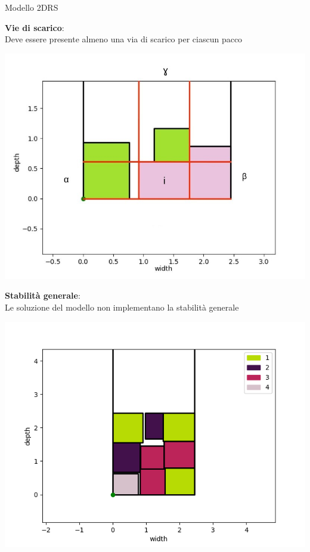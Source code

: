 \documentclass{beamer}
\begin{document}
\begin{frame}{Modello 2DRS}
					
	\begin{minipage}[c]{0.45\textwidth}
		\textbf{Vie di scarico}:\\Deve essere presente almeno una via di scarico per ciascun pacco
	\end{minipage}
	\hfill
	\begin{minipage}[c]{0.45\textwidth}
		\includegraphics[width=1\linewidth]{figures/abg_2drs}
	\end{minipage}
																						
	\begin{minipage}[c]{0.45\textwidth}
		\textbf{Stabilit\`a generale}:\\Le soluzione del modello non implementano la stabilit\`a generale
	\end{minipage}
	\hfill
	\begin{minipage}[c]{0.45\textwidth}
		\includegraphics[width=1\linewidth]{figures/2d3d}
	\end{minipage}
\end{frame}
\end{document}
